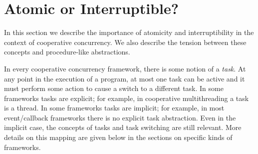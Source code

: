 \documentclass[preprint, 10pt, numbers]{sigplanconf}
\begin{document}




\section{Atomic or Interruptible?}

In this section we describe the importance of atomicity and interruptibility in the context of cooperative concurrency.
We also describe the tension between these concepts and procedure-like abstractions.

In every cooperative concurrency framework, there is some notion of a \emph{task}.
At any point in the execution of a program, at most one task can be active and it must perform some action to cause a switch to a different task.
In some frameworks tasks are explicit; for example, in cooperative multithreading a task is a thread.
In some frameworks tasks are implicit; for example, in most event/callback frameworks there is no explicit task abstraction.
Even in the implicit case, the concepts of tasks and task switching are still relevant.
More details on this mapping are given below in the sections on specific kinds of frameworks.
\end{document}
